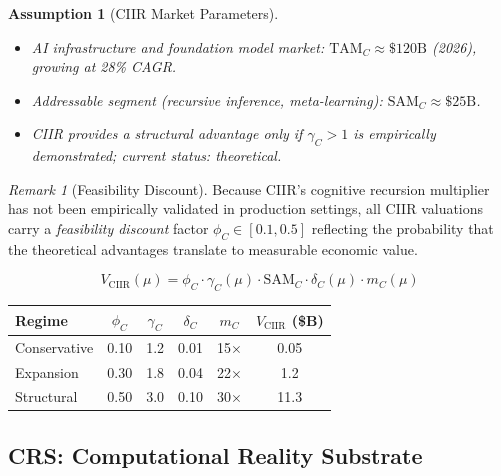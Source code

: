 \documentclass[11pt,a4paper]{article}
\newtheorem{assumption}[definition]{Assumption}
\theoremstyle{remark}
\newtheorem{remark}[definition]{Remark}
\newcommand{\VCIIR}{V_{\mathrm{CIIR}}}
\newcommand{\TAM}{\mathrm{TAM}}
\newcommand{\SAM}{\mathrm{SAM}}
\begin{document}
\begin{assumption}[CIIR Market Parameters]
\label{ass:ciir_market}
\begin{itemize}[nosep]
  \item AI infrastructure and foundation model market:
        $\TAM_C \approx \$120\text{B}$ (2026), growing at 28\% CAGR.
  \item Addressable segment (recursive inference, meta-learning):
        $\SAM_C \approx \$25\text{B}$.
  \item CIIR provides a structural advantage only if $\gamma_C > 1$
        is empirically demonstrated; current status: theoretical.
\end{itemize}
\end{assumption}

\begin{remark}[Feasibility Discount]
\label{rem:ciir_feasibility}
Because CIIR's cognitive recursion multiplier has not been empirically
validated in production settings, all CIIR valuations carry a
\emph{feasibility discount} factor $\phi_C \in [0.1, 0.5]$ reflecting
the probability that the theoretical advantages translate to
measurable economic value.
\end{remark}

\begin{equation}
  \VCIIR(\mu) = \phi_C \cdot \gamma_C(\mu) \cdot \SAM_C \cdot
  \delta_C(\mu) \cdot m_C(\mu)
  \label{eq:vciir}
\end{equation}

\begin{center}
\renewcommand{\arraystretch}{1.2}
\begin{tabular}{lccccc}
\toprule
\textbf{Regime} & $\phi_C$ & $\gamma_C$ & $\delta_C$ & $m_C$ & $\VCIIR$ \textbf{(\$B)} \\
\midrule
Conservative & 0.10 & 1.2 & 0.01 & 15$\times$ & 0.05  \\
Expansion    & 0.30 & 1.8 & 0.04 & 22$\times$ & 1.2   \\
Structural   & 0.50 & 3.0 & 0.10 & 30$\times$ & 11.3  \\
\bottomrule
\end{tabular}
\end{center}

\subsection{CRS: Computational Reality Substrate}
\label{subsec:crs}
\end{document}
